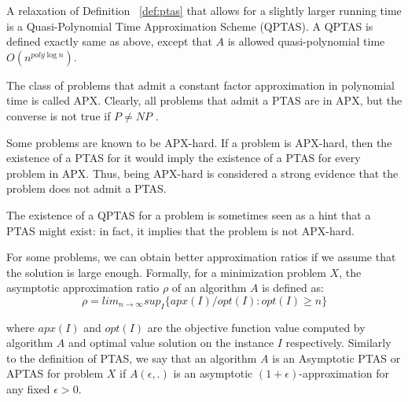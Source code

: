 A relaxation of Definition ~\ref{def:ptas} that allows for a
slightly larger running time is a Quasi-Polynomial Time Approximation Scheme
(QPTAS). A QPTAS is defined exactly same as above, except that $A$ is allowed quasi-polynomial
time $O(n^{poly \log n})$.

The class of problems that admit a constant factor approximation in polynomial time is called
APX. Clearly, all problems that admit a PTAS are in APX, but the converse
is not true if $P \neq NP$ \citep{jansen1998introduction}.

Some problems are known to be APX-hard. If a problem is APX-hard, then
the existence of a PTAS for it would imply the existence of a PTAS for every
problem in APX. Thus, being APX-hard is considered a strong evidence that
the problem does not admit a PTAS.

The existence of a QPTAS for a problem is sometimes seen as a hint that a
PTAS might exist: in fact, it implies that the problem is not APX-hard.

For some problems, we can obtain better approximation ratios if we assume
that the solution is large enough. Formally, for a minimization problem $X$, the
asymptotic approximation ratio $\rho$ of an algorithm $A$ is defined as:
\[
\rho = lim_{n \rightarrow \infty} sup_I \{ apx(I)/opt(I): opt(I) \ge n \}
\]

where $apx(I)$ and $opt(I)$ are the objective function value computed by algorithm $A$ and optimal value solution on the instance $I$ respectively.
Similarly to the definition of PTAS, we say that an algorithm $A$ is an
Asymptotic PTAS or APTAS for problem $X$ if $A(\epsilon, .)$ is an asymptotic $(1 + \epsilon)$-approximation for any fixed $\epsilon > 0$.

